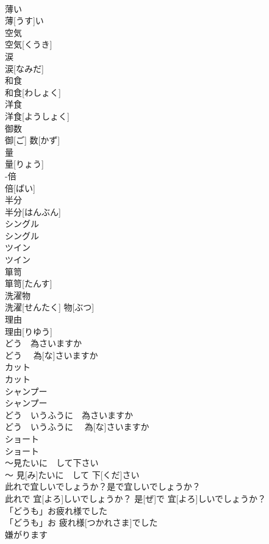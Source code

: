 \documentclass[8pt]{extreport}
\begin{document}
\begin{CJK}{UTF8}{min}
\\	薄い	
\\	薄[うす]い	
\\	空気	
\\	空気[くうき]	
\\	涙	
\\	涙[なみだ]	
\\	和食	
\\	和食[わしょく]	
\\	洋食	
\\	洋食[ようしょく]	
\\	御数	
\\	御[ご] 数[かず]	
\\	量	
\\	量[りょう]	
\\	-倍	
\\	倍[ばい]	
\\	半分	
\\	半分[はんぶん]	
\\	シングル	
\\	シングル	
\\	ツイン	
\\	ツイン	
\\	箪笥	
\\	箪笥[たんす]	
\\	洗濯物	
\\	洗濯[せんたく] 物[ぶつ]	
\\	理由	
\\	理由[りゆう]	
\\	どう　為さいますか	
\\	どう　 為[な]さいますか	
\\	カット	
\\	カット	
\\	シャンプー	
\\	シャンプー	
\\	どう　いうふうに　為さいますか	
\\	どう　いうふうに　 為[な]さいますか	
\\	ショート	
\\	ショート	
\\	〜見たいに　して下さい	
\\	〜 見[み]たいに　して 下[くだ]さい	
\\	此れで宜しいでしょうか？是で宜しいでしょうか？	
\\	此れで 宜[よろ]しいでしょうか？ 是[ぜ]で 宜[よろ]しいでしょうか？	
\\	「どうも」お疲れ様でした	
\\	「どうも」お 疲れ様[つかれさま]でした	
\\	嫌がります	

\end{CJK}
\end{document}
